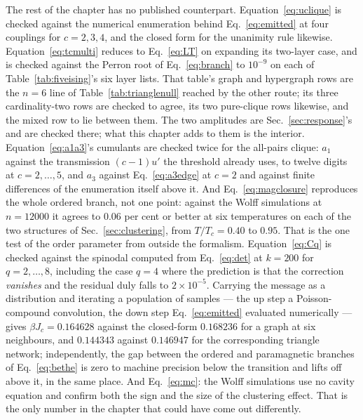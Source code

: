 The rest of the chapter has no published counterpart.
Equation~\eqref{eq:uclique} is checked against the numerical enumeration behind
Eq.~\eqref{eq:emitted} at four couplings for $c=2,3,4$, and the closed form for
the unanimity rule likewise. Equation~\eqref{eq:tcmulti} reduces to
Eq.~\eqref{eq:LT} on expanding its two-layer case, and is checked against the
Perron root of Eq.~\eqref{eq:branch} to $10^{-9}$ on each of
Table~\ref{tab:fiveising}'s six layer lists. That table's graph and hypergraph
rows are the $n=6$ line of Table~\ref{tab:trianglenull} reached by the other
route; its three cardinality-two rows are checked to agree, its two pure-clique
rows likewise, and the mixed row to lie between them.
The two amplitudes are Sec.~\ref{sec:response}'s and are checked there; what
this chapter adds to them is the interior. Equation~\eqref{eq:a1a3}'s cumulants
are checked twice for the all-pairs clique: $a_{1}$ against the transmission
$(c-1)u'$ the threshold already uses, to twelve digits at $c=2,\dots,5$, and
$a_{3}$ against Eq.~\eqref{eq:a3edge} at $c=2$ and against finite differences of
the enumeration itself above it. And Eq.~\eqref{eq:magclosure} reproduces the
whole ordered branch, not one point: against the Wolff simulations at $n=12000$
it agrees to $0.06$ per cent or better at six temperatures on each of the two
structures of Sec.~\ref{sec:clustering}, from $T/T_{c}=0.40$ to $0.95$. That is
the one test of the order parameter from outside the formalism. Equation~\eqref{eq:Cq} is checked against the
spinodal computed from Eq.~\eqref{eq:det} at $k=200$ for $q=2,\dots,8$,
including the case $q=4$ where the prediction is that the correction
\emph{vanishes} and the residual duly falls to $2\times10^{-5}$. Carrying the
message as a distribution and iterating a population of samples --- the up step
a Poisson-compound convolution, the down step Eq.~\eqref{eq:emitted} evaluated
numerically --- gives $\beta J_{c}=0.164628$ against the closed-form $0.168236$
for a graph at six neighbours, and $0.144343$ against $0.146947$ for the
corresponding triangle network; independently, the gap between the ordered and
paramagnetic branches of Eq.~\eqref{eq:bethe} is zero to machine precision below
the transition and lifts off above it, in the same place. And
Eq.~\eqref{eq:mc}: the Wolff simulations use no cavity equation and confirm both
the sign and the size of the clustering effect. That is the only number in the
chapter that could have come out differently.

